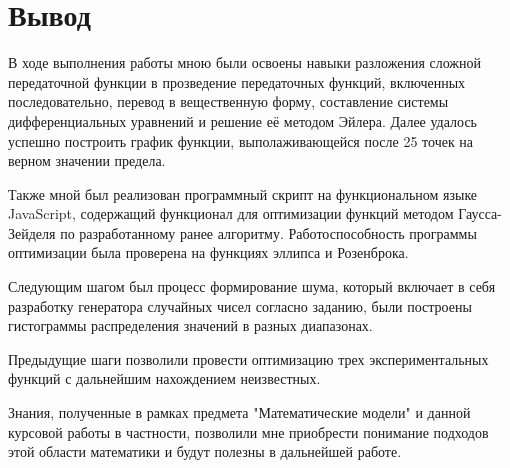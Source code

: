 \newpage
\part*{Вывод}
    В ходе выполнения работы мною были освоены навыки разложения сложной передаточной функции в прозведение передаточных функций, включенных последовательно, перевод в вещественную форму, составление системы дифференциальных уравнений и решение её методом Эйлера. Далее удалось успешно построить график функции, выполаживающейся после 25 точек на верном значении предела.

    Также мной был реализован программный скрипт на функциональном языке JavaScript, содержащий функционал для оптимизации функций методом Гаусса-Зейделя по разработанному ранее алгоритму. Работоспособность программы оптимизации была проверена на функциях эллипса и Розенброка.

    Следующим шагом был процесс формирование шума, который включает в себя разработку генератора случайных чисел согласно заданию, были построены гистограммы распределения значений в разных диапазонах.

    Предыдущие шаги позволили провести оптимизацию трех экспериментальных функций с дальнейшим нахождением неизвестных.

    Знания, полученные в рамках предмета "Математические модели" и данной курсовой работы в частности, позволили мне приобрести понимание подходов этой области математики и будут полезны в дальнейшей работе.
